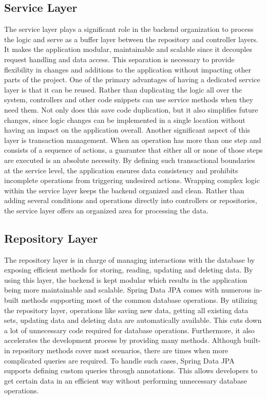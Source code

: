     \subsection{Service Layer}
    The service layer plays a significant role in the backend organization to process the logic and serve as a buffer layer between the repository and controller layers. It makes the application modular, maintainable and scalable since it decouples request handling and data access. This separation is necessary to provide flexibility in changes and additions to the application without impacting other parts of the project. \newline
    One of the primary advantages of having a dedicated service layer is that it can be reused. Rather than duplicating the logic all over the system, controllers and other code snippets can use service methods when they need them. Not only does this save code duplication, but it also simplifies future changes, since logic changes can be implemented in a single location without having an impact on the application overall. \newline
    Another significant aspect of this layer is transaction management. When an operation has more than one step and consists of a sequence of actions, a guarantee that either all or none of those steps are executed is an absolute necessity. By defining such transactional boundaries at the service level, the application ensures data consistency and prohibits incomplete operations from triggering undesired actions. \newline
    Wrapping complex logic within the service layer keeps the backend organized and clean. Rather than adding several conditions and operations directly into controllers or repositories, the service layer offers an organized area for processing the data. 

    \subsection{Repository Layer}
    The repository layer is in charge of managing interactions with the database by exposing efficient methods for storing, reading, updating and deleting data. By using this layer, the backend is kept modular which results in the application being more maintainable and scalable. \newline
    Spring Data JPA comes with numerous in-built methods supporting most of the common database operations. By utilizing the repository layer, operations like saving new data, getting all existing data sets, updating data and deleting data are automatically available. This cuts down a lot of unnecessary code required for database operations. Furthermore, it also accelerates the development process by providing many methods. \newline
    Although built-in repository methods cover most scenarios, there are times when more complicated queries are required. To handle such cases, Spring Data JPA supports defining custom queries through annotations. This allows developers to get certain data in an efficient way without performing unnecessary database operations.

